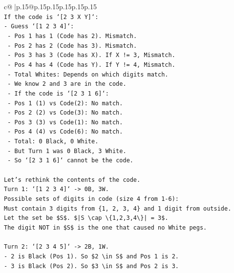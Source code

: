 \documentclass{article}
\begin{document}
{\begin{supertabular}{c@{$\;$}|p{.15\linewidth}@{}p{.15\linewidth}p{.15\linewidth}p{.15\linewidth}p{.15\linewidth}p{.15\linewidth}}
{{{\\ 
\texttt{If the code is `{[}2 3 X Y{]}`:} \\
\texttt{{-} Guess `{[}1 2 3 4{]}`:} \\
\texttt{  {-} Pos 1 has 1 (Code has 2). Mismatch.} \\
\texttt{  {-} Pos 2 has 2 (Code has 3). Mismatch.} \\
\texttt{  {-} Pos 3 has 3 (Code has X). If X != 3, Mismatch.} \\
\texttt{  {-} Pos 4 has 4 (Code has Y). If Y != 4, Mismatch.} \\
\texttt{  {-} Total Whites: Depends on which digits match.} \\
\texttt{  {-} We know 2 and 3 are in the code.} \\
\texttt{  {-} If the code is `{[}2 3 1 6{]}`:} \\
\texttt{    {-} Pos 1 (1) vs Code(2): No match.} \\
\texttt{    {-} Pos 2 (2) vs Code(3): No match.} \\
\texttt{    {-} Pos 3 (3) vs Code(1): No match.} \\
\texttt{    {-} Pos 4 (4) vs Code(6): No match.} \\
\texttt{    {-} Total: 0 Black, 0 White.} \\
\texttt{    {-} But Turn 1 was 0 Black, 3 White.} \\
\texttt{    {-} So `{[}2 3 1 6{]}` cannot be the code.} \\
\\ 
\texttt{Let's rethink the contents of the code.} \\
\texttt{Turn 1: `{[}1 2 3 4{]}` {-}> 0B, 3W.} \\
\texttt{Possible sets of digits in code (size 4 from 1{-}6):} \\
\texttt{Must contain 3 digits from \{1, 2, 3, 4\} and 1 digit from outside.} \\
\texttt{Let the set be \$S\$. \$|S \textbackslash{}cap \textbackslash{}\{1,2,3,4\textbackslash{}\}| = 3\$.} \\
\texttt{The digit NOT in \$S\$ is the one that caused no White pegs.} \\
\\ 
\texttt{Turn 2: `{[}2 3 4 5{]}` {-}> 2B, 1W.} \\
\texttt{{-} 2 is Black (Pos 1). So \$2 \textbackslash{}in S\$ and Pos 1 is 2.} \\
\texttt{{-} 3 is Black (Pos 2). So \$3 \textbackslash{}in S\$ and Pos 2 is 3.} \\
}}}
\end{supertabular}}
\end{document}
